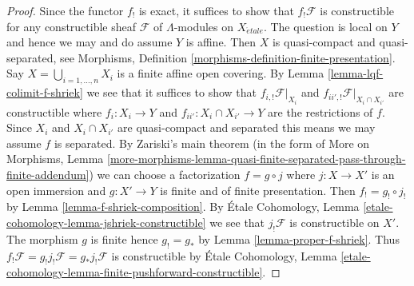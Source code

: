 \documentclass{stacks-project}
\theoremstyle{plain}
\theoremstyle{definition}
\theoremstyle{remark}
\numberwithin{equation}{subsection}
\def\etale{{\acute{e}tale}}
\begin{document}
\begin{proof}
Since the functor $f_!$ is exact, it suffices to show that
$f_!\mathcal{F}$ is constructible for any constructible sheaf
$\mathcal{F}$ of $\Lambda$-modules on $X_\etale$.
The question is local on $Y$ and hence
we may and do assume $Y$ is affine.
Then $X$ is quasi-compact and quasi-separated, see
Morphisms, Definition \ref{morphisms-definition-finite-presentation}.
Say $X = \bigcup_{i = 1, \ldots, n} X_i$ is a finite affine open
covering. By Lemma \ref{lemma-lqf-colimit-f-shriek}
we see that it suffices to show that
$f_{i, !}\mathcal{F}|_{X_i}$ and $f_{ii', !}\mathcal{F}|_{X_i \cap X_{i'}}$
are constructible where $f_i : X_i \to Y$ and
$f_{ii'} : X_i \cap X_{i'} \to Y$ are the restrictions of $f$.
Since $X_i$ and $X_i \cap X_{i'}$ are quasi-compact and separated
this means we may assume $f$ is separated.
By Zariski's main theorem (in the form of
More on Morphisms, Lemma
\ref{more-morphisms-lemma-quasi-finite-separated-pass-through-finite-addendum})
we can choose a factorization $f = g \circ j$ where
$j : X \to X'$ is an open immersion and $g : X' \to Y$ is
finite and of finite presentation. Then $f_! = g_! \circ j_!$ by
Lemma \ref{lemma-f-shriek-composition}.
By \'Etale Cohomology, Lemma \ref{etale-cohomology-lemma-jshriek-constructible}
we see that $j_!\mathcal{F}$ is constructible on $X'$.
The morphism $g$ is finite hence $g_! = g_*$
by Lemma \ref{lemma-proper-f-shriek}.
Thus $f_!\mathcal{F} = g_!j_!\mathcal{F} = g_*j_!\mathcal{F}$
is constructible by
\'Etale Cohomology, Lemma
\ref{etale-cohomology-lemma-finite-pushforward-constructible}.
\end{proof}
\end{document}
